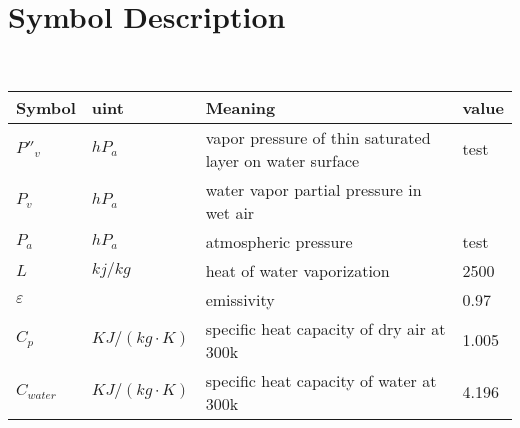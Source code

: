 \documentclass{mcmthesis}
\begin{document}
\section{Symbol Description}
\begin{table}[H]
        \setlength{\abovecaptionskip}{0pt}
        \setlength{\belowcaptionskip}{0pt}
				\\
        \begin{tabular}{p{2cm}|p{2cm}|p{7.5cm}|p{1.7cm}}
		\hline
		\rowcolor[gray]{0.9}\bf{Symbol}	&\bf{uint}      &\bf{Meaning}&\bf{value}	\\
		\hline
		${P}''_{v}$		& $hP_{a}$		 & vapor pressure of thin saturated layer on water surface  &test\\
		$P_{v}$		& $hP_{a}$		 & water vapor partial pressure in wet air\\
		$P_{a}$		& $hP_{a}$		 & atmospheric pressure  &test\\
		$L$		& $kj/kg$		 & heat of water vaporization&2500\\
		$\varepsilon$		& 		 & emissivity&0.97\\
		$C_{p}$		& $KJ/(kg\cdot K)$		 & specific heat capacity of dry air at 300k &1.005\\
		$C_{water}$		& $KJ/(kg\cdot K)$		 & specific heat capacity of water at 300k &4.196\\

		\hline
		\end{tabular}
	\end{table}
\end{document}
